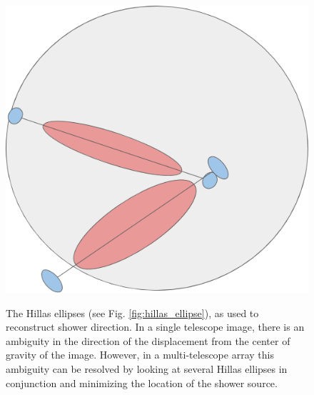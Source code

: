 \documentclass[main.tex]{subfiles}
\begin{document}
\begin{figure}[H]
  \begin{center}
      \includegraphics[width=0.48\linewidth]{images/Disp_FOV}
      \label{fig:Disp_FOV}
  \end{center}
  \caption[The Disp Parameter.]{The Hillas ellipses (see Fig. \ref{fig:hillas_ellipse}), as used to reconstruct shower direction. In a single telescope image, there is an ambiguity in the direction of the displacement from the center of gravity of the image. However, in a multi-telescope array this ambiguity can be resolved by looking at several Hillas ellipses in conjunction and minimizing the location of the shower source.}
  \label{fig:Disp_FOV}
\end{figure}

\end{document}
